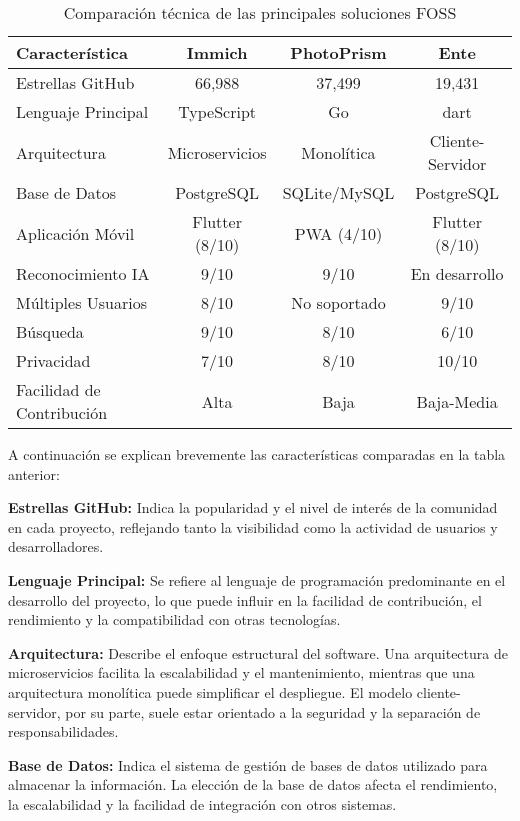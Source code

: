 \begin{table}[H]
\centering
\begin{tabular}{|l|c|c|c|}
\hline
\textbf{Característica} & \textbf{Immich} & \textbf{PhotoPrism} & \textbf{Ente} \\
\hline
Estrellas GitHub & 66,988 & 37,499 & 19,431 \\
Lenguaje Principal & TypeScript & Go & \gls{dart} \\
Arquitectura & Microservicios & Monolítica & Cliente-Servidor \\
Base de Datos & PostgreSQL & SQLite/MySQL & PostgreSQL \\
Aplicación Móvil & Flutter (8/10) & PWA (4/10) & Flutter (8/10) \\
Reconocimiento IA & 9/10 & 9/10 & En desarrollo \\
Múltiples Usuarios & 8/10 & No soportado & 9/10 \\
Búsqueda & 9/10 & 8/10 & 6/10 \\
Privacidad & 7/10 & 8/10 & 10/10 \\
Facilidad de Contribución & Alta & Baja & Baja-Media \\
\hline
\end{tabular}
\caption{Comparación técnica de las principales soluciones FOSS}
\label{tab:tech_comparison}
\end{table}

A continuación se explican brevemente las características comparadas en la tabla anterior:

\textbf{Estrellas GitHub:} Indica la popularidad y el nivel de interés de la comunidad en cada proyecto, reflejando tanto la visibilidad como la actividad de usuarios y desarrolladores.

\textbf{Lenguaje Principal:} Se refiere al lenguaje de programación predominante en el desarrollo del proyecto, lo que puede influir en la facilidad de contribución, el rendimiento y la compatibilidad con otras tecnologías.

\textbf{Arquitectura:} Describe el enfoque estructural del software. Una arquitectura de microservicios facilita la escalabilidad y el mantenimiento, mientras que una arquitectura monolítica puede simplificar el despliegue. El modelo cliente-servidor, por su parte, suele estar orientado a la seguridad y la separación de responsabilidades.

\textbf{Base de Datos:} Indica el sistema de gestión de bases de datos utilizado para almacenar la información. La elección de la base de datos afecta el rendimiento, la escalabilidad y la facilidad de integración con otros sistemas.

